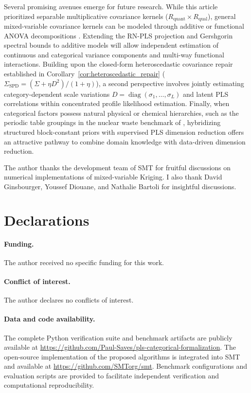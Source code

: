\documentclass[default,sn-mathphys,Numbered]{sn-jnl}
\theoremstyle{thmstyleone}
\theoremstyle{thmstylethree}
\theoremstyle{thmstyletwo}
\newcommand{\diag}{\operatorname{diag}}
\begin{document}
Several promising avenues emerge for future research. While this article prioritized separable multiplicative covariance kernels ($R_{\mathrm{quant}} \times R_{\mathrm{qual}}$), general mixed-variable covariance kernels can be modeled through additive or functional ANOVA decompositions \citep{Roustant}. Extending the RN-PLS projection and Gershgorin spectral bounds to additive models will allow independent estimation of continuous and categorical variance components and multi-way functional interactions. Building upon the closed-form heteroscedastic covariance repair established in Corollary~\ref{cor:heteroscedastic_repair} ($\Sigma_{\mathrm{SPD}} = (\Sigma + \eta D^2)/(1+\eta)$), a second perspective involves jointly estimating category-dependent scale variations $D = \diag(\sigma_1, \ldots, \sigma_L)$ and latent PLS correlations within concentrated profile likelihood estimation. Finally, when categorical factors possess natural physical or chemical hierarchies, such as the periodic table groupings in the nuclear waste benchmark of \citet{Roustant}, hybridizing structured block-constant priors with supervised PLS dimension reduction offers an attractive pathway to combine domain knowledge with data-driven dimension reduction.

The author thanks the development team of SMT for fruitful discussions on numerical implementations of mixed-variable Kriging.
I also thank David Ginsbourger, Youssef Diouane, and Nathalie Bartoli for insightful discussions.


\section*{Declarations}
\paragraph{Funding.} The author received no specific funding for this work. 
\paragraph{Conflict of interest.} The author declares no conflicts of interest. 
\paragraph{Data and code availability.} The complete Python verification suite and benchmark artifacts are publicly available at \url{https://github.com/Paul-Saves/pls-categorical-formalization}. The open-source implementation of the proposed algorithms is integrated into SMT \citep{saves2023smt} and available at \url{https://github.com/SMTorg/smt}. Benchmark configurations and evaluation scripts are provided to facilitate independent verification and computational reproducibility.  
\end{document}
